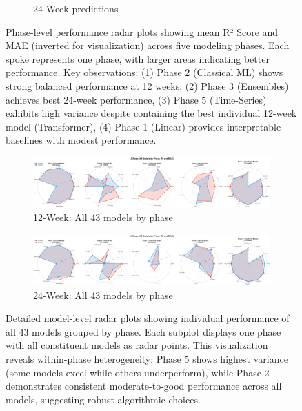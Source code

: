 \documentclass[conference]{IEEEtran}
\begin{document}
\begin{figure}[t]
\begin{subfigure}[b]{0.48\textwidth}
    \caption{24-Week predictions}
\end{subfigure}
\caption{Phase-level performance radar plots showing mean R² Score and MAE (inverted for visualization) across five modeling phases. Each spoke represents one phase, with larger areas indicating better performance. Key observations: (1) Phase 2 (Classical ML) shows strong balanced performance at 12 weeks, (2) Phase 3 (Ensembles) achieves best 24-week performance, (3) Phase 5 (Time-Series) exhibits high variance despite containing the best individual 12-week model (Transformer), (4) Phase 1 (Linear) provides interpretable baselines with modest performance.}
\label{fig:phase_radar}
\end{figure}

\begin{figure}[t]
\centering
\begin{subfigure}[b]{0.48\textwidth}
    \centering
    \includegraphics[width=\textwidth]{figures/phase_models_radar_12w_detailed.png}
    \caption{12-Week: All 43 models by phase}
\end{subfigure}
\hfill
\begin{subfigure}[b]{0.48\textwidth}
    \centering
    \includegraphics[width=\textwidth]{figures/phase_models_radar_24w_detailed.png}
    \caption{24-Week: All 43 models by phase}
\end{subfigure}
\caption{Detailed model-level radar plots showing individual performance of all 43 models grouped by phase. Each subplot displays one phase with all constituent models as radar points. This visualization reveals within-phase heterogeneity: Phase 5 shows highest variance (some models excel while others underperform), while Phase 2 demonstrates consistent moderate-to-good performance across all models, suggesting robust algorithmic choices.}
\label{fig:phase_models_detailed}
\end{figure}
\end{document}
